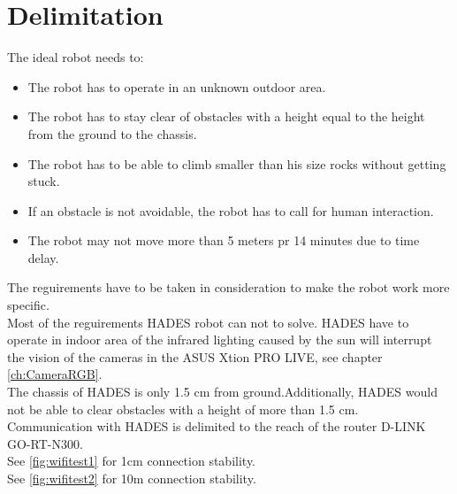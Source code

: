 \chapter{Delimitation} \label{ch:Delimitation}

The ideal robot needs to:

\begin{itemize}
    \item The robot has to operate in an unknown outdoor area.
    \item The robot has to stay clear of obstacles with a height equal to the height from the ground to the chassis. 
    \item The robot has to be able to climb smaller than his size rocks without getting stuck.
    \item If an obstacle is not avoidable, the robot has to call for human interaction.%
    \item The robot may not move more than 5 meters pr 14 minutes due to time delay.
\end{itemize}

The reguirements have to be taken in consideration to make the robot work more specific.\\
Most of the reguirements HADES robot can not to solve. 
HADES have to operate in indoor area of the infrared lighting caused by the sun will interrupt the vision of the cameras in the ASUS Xtion PRO LIVE, see chapter \ref{ch:CameraRGB}.\\
The chassis of HADES is only 1.5 cm from ground.Additionally, HADES would not be able to clear obstacles with a height of more than 1.5 cm.\\
Communication with HADES is delimited to the reach of the router D-LINK GO-RT-N300.\\
See \ref{fig:wifitest1} for 1cm connection stability.\\
See \ref{fig:wifitest2} for 10m connection stability.\\




